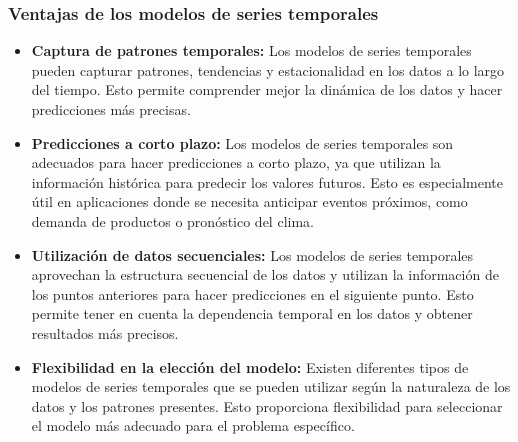 \subsubsection{Ventajas de los modelos de series temporales}
\begin{itemize}
    
        \item \textbf{Captura de patrones temporales:} Los modelos de series temporales pueden capturar patrones, tendencias y estacionalidad en los datos a lo largo del tiempo. Esto permite comprender mejor la dinámica de los datos y hacer predicciones más precisas.
        \item \textbf{Predicciones a corto plazo:} Los modelos de series temporales son adecuados para hacer predicciones a corto plazo, ya que utilizan la información histórica para predecir los valores futuros. Esto es especialmente útil en aplicaciones donde se necesita anticipar eventos próximos, como demanda de productos o pronóstico del clima.
        \item \textbf{Utilización de datos secuenciales:} Los modelos de series temporales aprovechan la estructura secuencial de los datos y utilizan la información de los puntos anteriores para hacer predicciones en el siguiente punto. Esto permite tener en cuenta la dependencia temporal en los datos y obtener resultados más precisos.
        \item \textbf{Flexibilidad en la elección del modelo:} Existen diferentes tipos de modelos de series temporales que se pueden utilizar según la naturaleza de los datos y los patrones presentes. Esto proporciona flexibilidad para seleccionar el modelo más adecuado para el problema específico.
\end{itemize}

